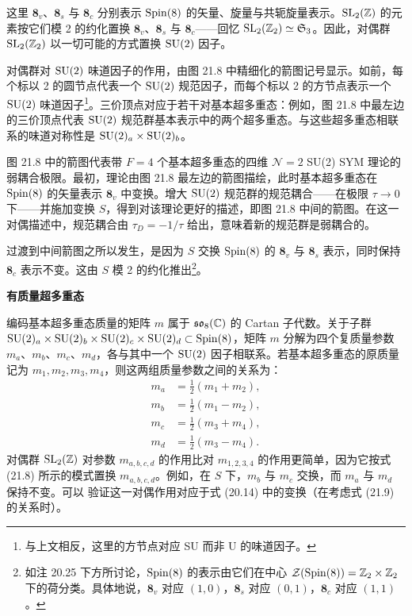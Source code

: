 这里 $\mathbf{8}_v$、$\mathbf{8}_s$ 与 $\mathbf{8}_c$ 分别表示 $\operatorname{Spin}(8)$ 的矢量、旋量与共轭旋量表示。$\operatorname{SL}_2(\mathbb{Z})$ 的元素按它们模 2 的约化置换 $\mathbf{8}_v$、$\mathbf{8}_s$ 与 $\mathbf{8}_c$——回忆 $\operatorname{SL}_2(\mathbb{Z}_2)\simeq\mathfrak{S}_3$。因此，对偶群 $\operatorname{SL}_2(\mathbb{Z}_2)$ 以一切可能的方式置换 $\operatorname{SU}(2)$ 因子。

对偶群对 $\operatorname{SU}(2)$ 味道因子的作用，由图 21.8 中精细化的箭图记号显示。如前，每个标以 2 的圆节点代表一个 $\operatorname{SU}(2)$ 规范因子，而每个标以 2 的方节点表示一个 $\operatorname{SU}(2)$ 味道因子\footnote{与上文相反，这里的方节点对应 SU 而非 U 的味道因子。}。三价顶点对应于若干对基本超多重态：例如，图 21.8 中最左边的三价顶点代表 $\operatorname{SU}(2)$ 规范群基本表示中的两个超多重态。与这些超多重态相联系的味道对称性是 $\operatorname{SU}(2)_a\times\operatorname{SU}(2)_b$。


图 21.8 中的箭图代表带 $F=4$ 个基本超多重态的四维 $\mathcal{N}=2$ SU(2) SYM 理论的弱耦合极限。最初，理论由图 21.8 最左边的箭图描绘，此时基本超多重态在 $\operatorname{Spin}(8)$ 的矢量表示 $\mathbf{8}_v$ 中变换。增大 $\operatorname{SU}(2)$ 规范群的规范耦合——在极限 $\tau\to0$ 下——并施加变换 $S$，得到对该理论更好的描述，即图 21.8 中间的箭图。在这一对偶描述中，规范耦合由 $\tau_D=-1/\tau$ 给出，意味着新的规范群是弱耦合的。

过渡到中间箭图之所以发生，是因为 $S$ 交换 $\operatorname{Spin}(8)$ 的 $\mathbf{8}_v$ 与 $\mathbf{8}_s$ 表示，同时保持 $\mathbf{8}_c$ 表示不变。这由 $S$ 模 2 的约化推出\footnote{如注 20.25 下方所讨论，$\operatorname{Spin}(8)$ 的表示由它们在中心 $\mathcal{Z}(\operatorname{Spin}(8))=\mathbb{Z}_2\times\mathbb{Z}_2$ 下的荷分类。具体地说，$\mathbf{8}_v$ 对应 $(1,0)$，$\mathbf{8}_s$ 对应 $(0,1)$，$\mathbf{8}_c$ 对应 $(1,1)$。}。

\noindent\textbf{有质量超多重态}

编码基本超多重态质量的矩阵 $m$ 属于 $\mathfrak{so}_8(\mathbb{C})$ 的 Cartan 子代数。关于子群 $\operatorname{SU}(2)_a\times\operatorname{SU}(2)_b\times\operatorname{SU}(2)_c\times\operatorname{SU}(2)_d\subset\operatorname{Spin}(8)$，矩阵 $m$ 分解为四个复质量参数 $m_a$、$m_b$、$m_c$、$m_d$，各与其中一个 $\operatorname{SU}(2)$ 因子相联系。若基本超多重态的原质量记为 $m_1,m_2,m_3,m_4$，则这两组质量参数之间的关系为：
\begin{equation}
\begin{aligned}
m_a&=\frac12(m_1+m_2),\\
m_b&=\frac12(m_1-m_2),\\
m_c&=\frac12(m_3+m_4),\\
m_d&=\frac12(m_3-m_4).
\end{aligned}
\tag{21.9}
\end{equation}
对偶群 $\operatorname{SL}_2(\mathbb{Z})$ 对参数 $m_{a,b,c,d}$ 的作用比对 $m_{1,2,3,4}$ 的作用更简单，因为它按式 (21.8) 所示的模式置换 $m_{a,b,c,d}$。例如，在 $S$ 下，$m_b$ 与 $m_c$ 交换，而 $m_a$ 与 $m_d$ 保持不变。可以
验证这一对偶作用对应于式 (20.14) 中的变换（在考虑式 (21.9) 的关系时）。

